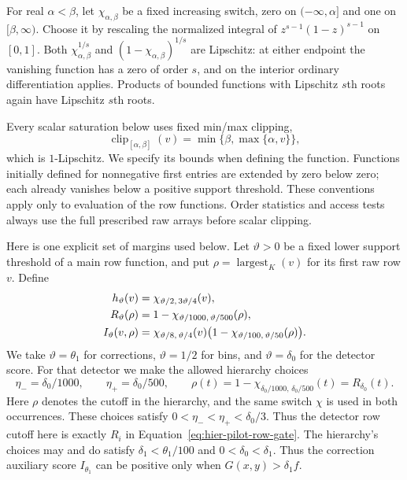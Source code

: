 For real $\alpha<\beta$, let $\chi_{\alpha,\beta}$ be a fixed increasing
switch, zero on $(-\infty,\alpha]$ and one on $[\beta,\infty)$.
Choose it by rescaling the normalized integral of
$z^{s-1}(1-z)^{s-1}$ on $[0,1]$.
Both $\chi_{\alpha,\beta}^{1/s}$ and
$(1-\chi_{\alpha,\beta})^{1/s}$ are Lipschitz: at either endpoint the
vanishing function has a zero of order $s$, and on the interior ordinary
differentiation applies.  Products of bounded functions with Lipschitz
$s$th roots again have Lipschitz $s$th roots.

Every scalar saturation below uses fixed min/max clipping,
\[
 \operatorname{clip}_{[\alpha,\beta]}(v)
   =\min\{\beta,\max\{\alpha,v\}\},
\]
which is $1$-Lipschitz.  We specify its bounds when defining the function.
Functions initially defined for nonnegative first entries are extended
by zero below zero; each already vanishes below a positive support
threshold.  These conventions apply only to evaluation of the row
functions.  Order statistics and access tests always use the full prescribed raw
arrays before scalar clipping.

Here is one explicit set of margins used below.  Let $\vartheta>0$ be a
fixed lower support threshold of a main row function, and put
$\rho=\operatorname{largest}_K(v)$ for its first raw row $v$.  Define
\begin{align}
 h_{\vartheta}(v)
   &=\chi_{\vartheta/2,\,3\vartheta/4}(v),\notag\\
 R_{\vartheta}(\rho)
   &=1-\chi_{\vartheta/1000,\,\vartheta/500}(\rho),\notag\\
 I_{\vartheta}(v,\rho)
   &=\chi_{\vartheta/8,\,\vartheta/4}(v)
       \bigl(1-\chi_{\vartheta/100,\,\vartheta/50}(\rho)\bigr).
 \label{eq:atom-threshold-template}
\end{align}
We take $\vartheta=\theta_1$ for corrections, $\vartheta=1/2$ for 
bins, and $\vartheta=\delta_0$ for the detector score.  For that detector
we make the allowed hierarchy choices
\[
 \eta_-=\delta_0/1000,\qquad \eta_+=\delta_0/500,\qquad
 \rho(t)=1-\chi_{\delta_0/1000,\,\delta_0/500}(t)
          =R_{\delta_0}(t).
\]
Here $\rho$ denotes the cutoff in the hierarchy, and the same switch
$\chi$ is used in both occurrences.  These choices satisfy
$0<\eta_-<\eta_+<\delta_0/3$.  Thus the detector row cutoff here is exactly
$R_i$ in Equation~\eqref{eq:hier-pilot-row-gate}.
The hierarchy's choices may and do satisfy
$\delta_1<\theta_1/100$ and $0<\delta_0<\delta_1$.
Thus the correction auxiliary score $I_{\theta_1}$ can be positive only
when $G(x,y)>\delta_1 f$.

